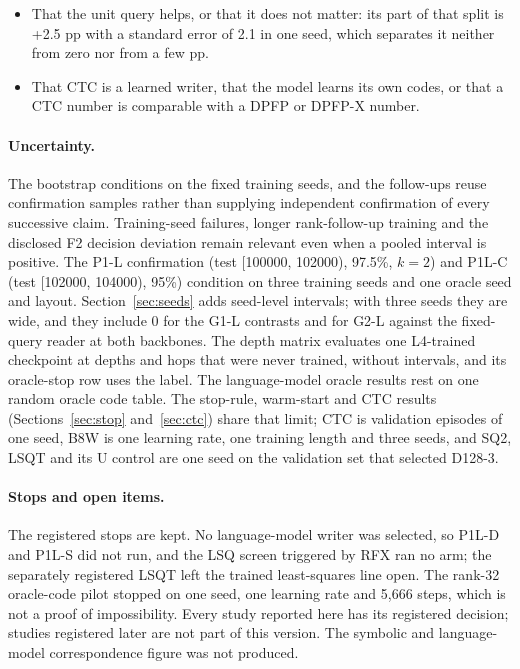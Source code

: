 \begin{itemize}[leftmargin=1.4em,itemsep=2pt,topsep=3pt]
\item That the unit query helps, or that it does not matter: its part of that split is +2.5 pp with a standard error of 2.1 in one seed, which separates it neither from zero nor from a few pp.  %
\item That CTC is a learned writer, that the model learns its own codes, or that a CTC number is comparable with a DPFP or DPFP-X number.  %
\end{itemize}

\paragraph{Uncertainty.}
The bootstrap conditions on the fixed training seeds, and the follow-ups reuse confirmation samples rather than supplying independent confirmation of every successive claim.  %
Training-seed failures, longer rank-follow-up training and the disclosed F2 decision deviation remain relevant even when a pooled interval is positive.  %
The P1-L confirmation (test [100000, 102000), 97.5\%, $k=2$) and P1L-C (test [102000, 104000), 95\%) condition on three training seeds and one oracle seed and layout.  %
Section~\ref{sec:seeds} adds seed-level intervals; with three seeds they are wide, and they include 0 for the G1-L contrasts and for G2-L against the fixed-query reader at both backbones.  %
The depth matrix evaluates one L4-trained checkpoint at depths and hops that were never trained, without intervals, and its oracle-stop row uses the label.  %
The language-model oracle results rest on one random oracle code table.
The stop-rule, warm-start and CTC results (Sections~\ref{sec:stop} and~\ref{sec:ctc}) share that limit; CTC is validation episodes of one seed, B8W is one learning rate, one training length and three seeds, and SQ2, LSQT and its U control are one seed on the validation set that selected D128-3.  %

\paragraph{Stops and open items.}
The registered stops are kept.
No language-model writer was selected, so P1L-D and P1L-S did not run, and the LSQ screen triggered by RFX ran no arm; the separately registered LSQT left the trained least-squares line open.  %
The rank-32 oracle-code pilot stopped on one seed, one learning rate and 5,666 steps, which is not a proof of impossibility.  %
Every study reported here has its registered decision; studies registered later are not part of this version.
The symbolic and language-model correspondence figure was not produced.

